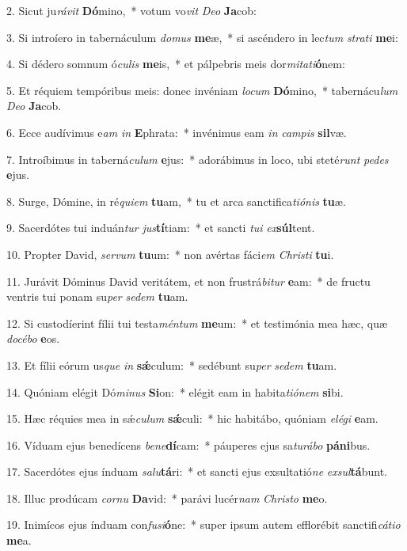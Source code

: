 2. Sicut ju\textit{rá}\textit{vit} \textbf{Dó}mino,~*  votum vo\textit{vit} \textit{De}\textit{o} \textbf{Ja}cob:\

3. Si introíero in tabernáculum \textit{do}\textit{mus} \textbf{me}æ,~*  si ascéndero in lec\textit{tum} \textit{stra}\textit{ti} \textbf{me}i:\

4. Si dédero somnum ó\textit{cu}\textit{lis} \textbf{me}is,~*  et pálpebris meis dor\textit{mi}\textit{ta}\textit{ti}\textbf{ó}nem:\

5. Et réquiem tempóribus meis: donec invéniam \textit{lo}\textit{cum} \textbf{Dó}mino,~*  tabernácu\textit{lum} \textit{De}\textit{o} \textbf{Ja}cob.\

6. Ecce audívimus e\textit{am} \textit{in} \textbf{E}phrata:~*  invénimus eam \textit{in} \textit{cam}\textit{pis} \textbf{sil}væ.\

7. Introíbimus in taberná\textit{cu}\textit{lum} \textbf{e}jus:~*  adorábimus in loco, ubi steté\textit{runt} \textit{pe}\textit{des} \textbf{e}jus.\

8. Surge, Dómine, in ré\textit{qui}\textit{em} \textbf{tu}am,~*  tu et arca sanctifica\textit{ti}\textit{ó}\textit{nis} \textbf{tu}æ.\

9. Sacerdótes tui induán\textit{tur} \textit{jus}\textbf{tí}tiam:~*  et sancti \textit{tu}\textit{i} \textit{ex}\textbf{súl}tent.\

10. Propter David, \textit{ser}\textit{vum} \textbf{tu}um:~*  non avértas fáci\textit{em} \textit{Chris}\textit{ti} \textbf{tu}i.\

11. Jurávit Dóminus David veritátem, et non frustrá\textit{bi}\textit{tur} \textbf{e}am:~*  de fructu ventris tui ponam su\textit{per} \textit{se}\textit{dem} \textbf{tu}am.\

12. Si custodíerint fílii tui testa\textit{mén}\textit{tum} \textbf{me}um:~*  et testimónia mea hæc, quæ \textit{do}\textit{cé}\textit{bo} \textbf{e}os.\

13. Et fílii eórum us\textit{que} \textit{in} \textbf{sǽ}culum:~*  sedébunt su\textit{per} \textit{se}\textit{dem} \textbf{tu}am.\

14. Quóniam elégit Dó\textit{mi}\textit{nus} \textbf{Si}on:~*  elégit eam in habita\textit{ti}\textit{ó}\textit{nem} \textbf{si}bi.\

15. Hæc réquies mea in sǽ\textit{cu}\textit{lum} \textbf{sǽ}culi:~*  hic habitábo, quóniam \textit{e}\textit{lé}\textit{gi} \textbf{e}am.\

16. Víduam ejus benedícens \textit{be}\textit{ne}\textbf{dí}cam:~*  páuperes ejus sa\textit{tu}\textit{rá}\textit{bo} \textbf{pá}\textbf{ni}bus.\

17. Sacerdótes ejus índuam \textit{sa}\textit{lu}\textbf{tá}ri:~*  et sancti ejus exsultatió\textit{ne} \textit{ex}\textit{sul}\textbf{tá}bunt.\

18. Illuc prodúcam \textit{cor}\textit{nu} \textbf{Da}vid:~*  parávi lucér\textit{nam} \textit{Chris}\textit{to} \textbf{me}o.\

19. Inimícos ejus índuam con\textit{fu}\textit{si}\textbf{ó}ne:~*  super ipsum autem efflorébit sanctifi\textit{cá}\textit{ti}\textit{o} \textbf{me}a.\

